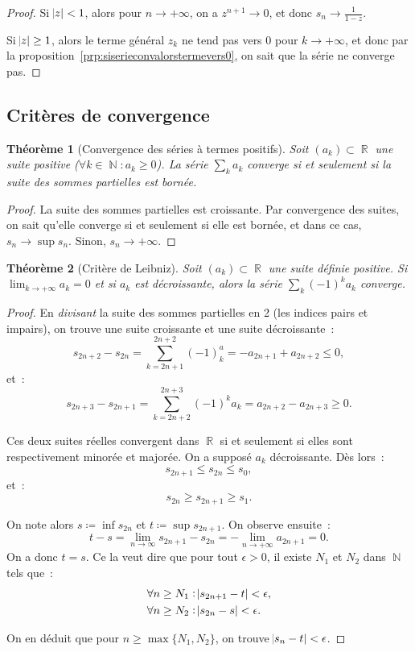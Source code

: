 \documentclass{article}
\DeclareMathOperator{\N}{\mathbb N}
\DeclareMathOperator{\R}{\mathbb R}
\newtheorem{thm}{Théorème}[section]
\theoremstyle{definition}
\theoremstyle{remark}
\begin{document}
		\begin{proof} Si $\abs z < 1$, alors pour $n \to +\infty$, on a $z^{n+1} \to 0$, et donc $s_n \to \frac 1{1-z}$.

		Si $\abs z \geq 1$, alors le terme général $z_k$ ne tend pas vers 0 pour $k \to +\infty$, et donc par la
		proposition~\ref{prp:siserieconvalorstermevers0}, on sait que la série ne converge pas.
		\end{proof}

	\subsection{Critères de convergence}
		\begin{thm}[Convergence des séries à termes positifs] Soit $(a_k) \subset \R$ une suite positive ($\forall k \in \N : a_k \geq 0$).
		La série $\sum_k a_k$ converge si et seulement si la suite des sommes partielles est bornée.
		\end{thm}

		\begin{proof} La suite des sommes partielles est croissante. Par convergence des suites, on sait qu'elle converge si et seulement si elle est bornée, et
		dans ce cas, $s_n \to \sup s_n$. Sinon, $s_n \to +\infty$.
		\end{proof}

		\begin{thm}[Critère de Leibniz] Soit $(a_k) \subset \R$ une suite définie positive. Si $\lim_{k \to +\infty}a_k = 0$ et si $a_k$ est décroissante, alors
		la série $\sum_k(-1)^ka_k$ converge.
		\end{thm}

		\begin{proof} En \emph{divisant} la suite des sommes partielles en 2 (les indices pairs et impairs), on trouve une suite croissante et une suite
		décroissante~:
		\[s_{2n+2} - s_{2n} = \sum_{k=2n+1}^{2n+2}(-1)^a_k = -a_{2n+1} + a_{2n+2} \leq 0,\]
		et~:
		\[s_{2n+3} - s_{2n+1} = \sum_{k=2n+2}^{2n+3}(-1)^ka_k = a_{2n+2} - a_{2n+3} \geq 0.\]

		Ces deux suites réelles convergent dans $\R$ si et seulement si elles sont respectivement minorée et majorée. On a supposé $a_k$ décroissante.
		Dès lors~:
		\[s_{2n+1} \leq s_{2n} \leq s_0,\]
		et~:
		\[s_{2n} \geq s_{2n+1} \geq s_1.\]

		On note alors $s \coloneqq \inf s_{2n}$ et $t \coloneqq \sup s_{2n+1}$. On observe ensuite~:
		\[t-s = \lim_{n \to \infty}s_{2n+1}-s_{2n} = -\lim_{n \to +\infty}a_{2n+1} = 0.\]
		On a donc $t = s$. Ce la veut dire que pour tout $\epsilon > 0$, il existe $N_1$ et $N_2$ dans $\N$ tels que~:
		\begin{align*}
			\forall n \geq N_1 &: \abs {s_{2n+1}-t} < \epsilon, \\
			\forall n \geq N_2 &: \abs {s_{2n} - s} < \epsilon.
		\end{align*}

		On en déduit que pour $n \geq \max\{N_1, N_2\}$, on trouve $\abs {s_n-t} < \epsilon$.
		\end{proof}
\end{document}
